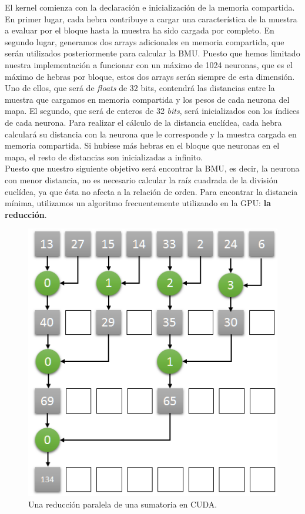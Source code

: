 El kernel comienza con la declaración e inicialización de la memoria compartida.\\

En primer lugar, cada hebra contribuye a cargar una característica de la muestra a evaluar por el bloque hasta la muestra ha sido cargada por completo. En segundo lugar, generamos dos arrays adicionales en memoria compartida, que serán utilizados posteriormente para calcular la BMU. Puesto que hemos limitado nuestra implementación a funcionar con un máximo de 1024 neuronas, que es el máximo de hebras por bloque, estos dos arrays serán siempre de esta dimensión. Uno de ellos, que será de \textit{floats} de 32 bits, contendrá las distancias entre la muestra que cargamos en memoria compartida y los pesos de cada neurona del mapa. El segundo, que será de enteros de 32 \textit{bits}, será inicializados con los índices de cada neurona. Para realizar el cálculo de la distancia euclídea, cada hebra calculará su distancia con la neurona que le corresponde y la muestra cargada en memoria compartida. Si hubiese más hebras en el bloque que neuronas en el mapa, el resto de distancias son inicializadas a infinito. \\

Puesto que nuestro siguiente objetivo será encontrar la BMU, es decir, la neurona con menor distancia, no es necesario calcular la raíz cuadrada de la división euclídea, ya que ésta no afecta a la relación de orden. Para encontrar la distancia mínima, utilizamos un algoritmo frecuentemente utilizando en la GPU: \textbf{la reducción}.
\begin{figure}[ht]
\centering
\includegraphics[scale=0.5]{imagenes/parallel_reduce.png}
\caption{Una reducción paralela de una sumatoria en CUDA.}
\label{image:cudareduction}
\end{figure}

